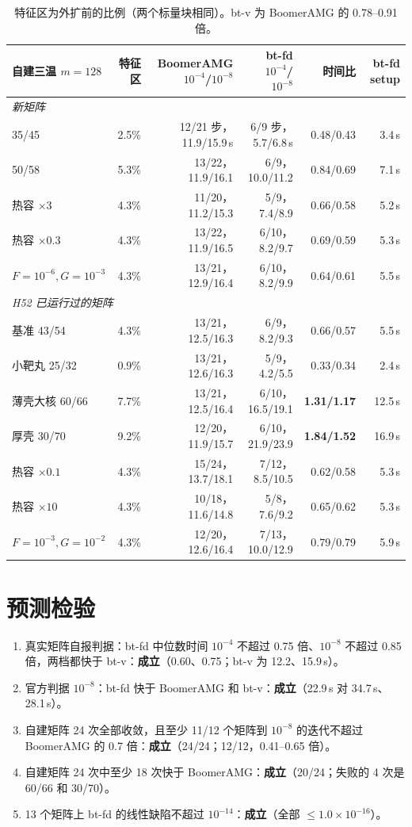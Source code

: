 \documentclass[11pt,a4paper]{ctexart}
\begin{document}
\begin{table}[H]
\centering\footnotesize\setlength{\tabcolsep}{4pt}
\begin{tabular}{lrrrrr}
\toprule
自建三温 $m=128$ & 特征区 & BoomerAMG $10^{-4}$/$10^{-8}$ & bt-fd $10^{-4}$/$10^{-8}$ & 时间比 & bt-fd setup \\
\midrule
\multicolumn{6}{l}{\emph{新矩阵}} \\
35/45 & 2.5\% & 12/21 步，11.9/15.9\,s & 6/9 步，5.7/6.8\,s & 0.48/0.43 & 3.4\,s \\
50/58 & 5.3\% & 13/22，11.9/16.1 & 6/9，10.0/11.2 & 0.84/0.69 & 7.1\,s \\
热容 $\times3$ & 4.3\% & 11/20，11.2/15.3 & 5/9，7.4/8.9 & 0.66/0.58 & 5.2\,s \\
热容 $\times0.3$ & 4.3\% & 13/22，11.9/16.5 & 6/10，8.2/9.7 & 0.69/0.59 & 5.3\,s \\
$F=10^{-6},G=10^{-3}$ & 4.3\% & 13/21，12.9/16.4 & 6/10，8.2/9.9 & 0.64/0.61 & 5.5\,s \\
\multicolumn{6}{l}{\emph{H52 已运行过的矩阵}} \\
基准 43/54 & 4.3\% & 13/21，12.5/16.3 & 6/9，8.2/9.3 & 0.66/0.57 & 5.5\,s \\
小靶丸 25/32 & 0.9\% & 13/21，12.6/16.3 & 5/9，4.2/5.5 & 0.33/0.34 & 2.4\,s \\
薄壳大核 60/66 & 7.7\% & 13/21，12.5/16.4 & 6/10，16.5/19.1 & \textbf{1.31/1.17} & 12.5\,s \\
厚壳 30/70 & 9.2\% & 12/20，11.9/15.7 & 6/10，21.9/23.9 & \textbf{1.84/1.52} & 16.9\,s \\
热容 $\times0.1$ & 4.3\% & 15/24，13.7/18.1 & 7/12，8.5/10.5 & 0.62/0.58 & 5.3\,s \\
热容 $\times10$ & 4.3\% & 10/18，11.6/14.8 & 5/8，7.6/9.2 & 0.65/0.62 & 5.3\,s \\
$F=10^{-3},G=10^{-2}$ & 4.3\% & 12/20，12.6/16.4 & 7/13，10.0/12.9 & 0.79/0.79 & 5.9\,s \\
\bottomrule
\end{tabular}
\caption{特征区为外扩前的比例（两个标量块相同）。bt-v 为 BoomerAMG 的 0.78--0.91 倍。}
\end{table}

\section{预测检验}
\begin{enumerate}
\item 真实矩阵自报判据：bt-fd 中位数时间 $10^{-4}$ 不超过 0.75 倍、$10^{-8}$ 不超过 0.85 倍，两档都快于 bt-v：\textbf{成立}（0.60、0.75；bt-v 为 12.2、15.9\,s）。
\item 官方判据 $10^{-8}$：bt-fd 快于 BoomerAMG 和 bt-v：\textbf{成立}（22.9\,s 对 34.7\,s、28.1\,s）。
\item 自建矩阵 24 次全部收敛，且至少 11/12 个矩阵到 $10^{-8}$ 的迭代不超过 BoomerAMG 的 0.7 倍：\textbf{成立}（24/24；12/12，0.41--0.65 倍）。
\item 自建矩阵 24 次中至少 18 次快于 BoomerAMG：\textbf{成立}（20/24；失败的 4 次是 60/66 和 30/70）。
\item 13 个矩阵上 bt-fd 的线性缺陷不超过 $10^{-14}$：\textbf{成立}（全部 $\le1.0\times10^{-16}$）。
\end{enumerate}
\end{document}
